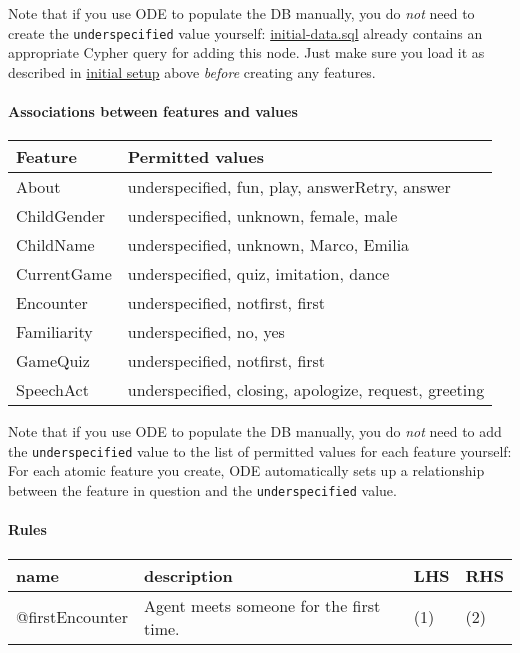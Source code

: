 \documentclass[11pt]{article}
\begin{document}
Note that if you use ODE to populate the DB manually, you do
\emph{not} need to create the \texttt{underspecified} value yourself:
\href{initial-data.cql}{initial-data.sql} already contains an appropriate Cypher query for
adding this node. Just make sure you load it as described in
\href{https://github.com/itsjeyd/ODE#initial-setup}{initial setup} above \emph{before} creating any features.

\paragraph{Associations between features and values}
\label{sec-3-4-1-3}
\begin{center}
\begin{tabular}{ll}
\hline
\textbf{Feature} & \textbf{Permitted values}\\
\hline
About & underspecified, fun, play, answerRetry, answer\\
ChildGender & underspecified, unknown, female, male\\
ChildName & underspecified, unknown, Marco, Emilia\\
CurrentGame & underspecified, quiz, imitation, dance\\
Encounter & underspecified, notfirst, first\\
Familiarity & underspecified, no, yes\\
GameQuiz & underspecified, notfirst, first\\
SpeechAct & underspecified, closing, apologize, request, greeting\\
\hline
\end{tabular}
\end{center}

Note that if you use ODE to populate the DB manually, you do
\emph{not} need to add the \texttt{underspecified} value to the list of
permitted values for each feature yourself: For each atomic
feature you create, ODE automatically sets up a relationship
between the feature in question and the \texttt{underspecified} value.

\paragraph{Rules}
\label{sec-3-4-1-4}
\begin{center}
\begin{tabular}{llll}
\hline
\textbf{name} & \textbf{description} & \textbf{LHS} & \textbf{RHS}\\
\hline
@firstEncounter & Agent meets someone for the first time. & (1) & (2)\\
\hline
\end{tabular}
\end{center}
\end{document}
